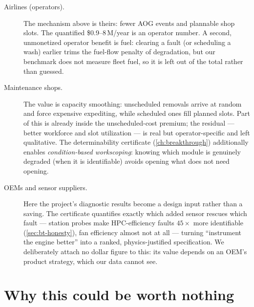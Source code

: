 \begin{description}
  \item[Airlines (operators).] The mechanism above is theirs: fewer AOG events and plannable
    shop slots. The quantified \$0.9--8\,M/year is an operator number. A second, unmonetized
    operator benefit is fuel: clearing a fault (or scheduling a wash) earlier trims the
    fuel-flow penalty of degradation, but our benchmark does not measure fleet fuel, so it is
    left out of the total rather than guessed.
  \item[Maintenance shops.] The value is capacity smoothing: unscheduled removals
    arrive at random and force expensive expediting, while scheduled ones fill planned slots.
    Part of this is already inside the unscheduled-cost premium; the residual --- better
    workforce and slot utilization --- is real but operator-specific and left qualitative.
    The determinability certificate (\cref{ch:breakthrough}) additionally enables
    \emph{condition-based workscoping}: knowing which module is genuinely degraded (when it
    is identifiable) avoids opening what does not need opening.
  \item[OEMs and sensor suppliers.] Here the project's diagnostic results become a design
    input rather than a saving. The certificate quantifies exactly which added sensor rescues
    which fault --- station probes make HPC-efficiency faults $45\times$ more identifiable
    (\cref{sec:bt-honesty}), fan efficiency almost not at all --- turning ``instrument the
    engine better'' into a ranked, physics-justified specification. We deliberately attach no
    dollar figure to this: its value depends on an OEM's product strategy, which our data
    cannot see.
\end{description}

\section{Why this could be worth nothing}
\label{sec:econ-worthless}

